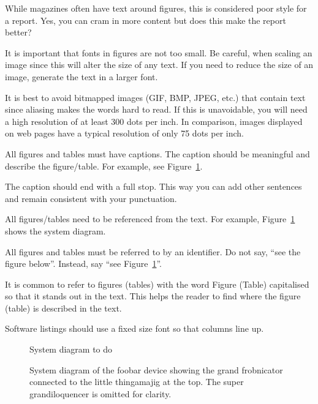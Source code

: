 \documentclass[a4paper,12pt]{article}
\newcommand{\reffig}[1]{\mbox{Figure~\ref{fig:#1}}}
\newcounter{foo}
\newcounter{bar}
\begin{document}
\begin{list}{F-}{}
\item While magazines often have text around figures, this is
  considered poor style for a report.  Yes, you can cram in more
  content but does this make the report better?

\item It is important that fonts in figures are not too small.  Be
  careful, when scaling an image since this will alter the size of any
  text.  If you need to reduce the size of an image, generate the text
  in a larger font.

\item It is best to avoid bitmapped images (GIF, BMP, JPEG, etc.) that
contain text since aliasing makes the words hard to read.  If this is
unavoidable, you will need a high resolution of at least 300 dots per
inch.  In comparison, images displayed on web pages have a typical
resolution of only 75 dots per inch.

\item All figures and tables must have captions.  The caption should
  be meaningful and describe the figure/table.  For example, see
  \reffig{example_figure1}.

\item The caption should end with a full stop.  This way you can add
  other sentences and remain consistent with your punctuation.

\item All figures/tables need to be referenced from the text.  For
  example, \reffig{example_figure1} shows the system diagram.

\item All figures and tables must be referred to by an identifier.
  Do not say, ``see the figure below''.  Instead, say ``see
  \reffig{example_figure1}''.

\item It is common to refer to figures (tables) with the word Figure
  (Table) capitalised so that it stands out in the text.  This helps
  the reader to find where the figure (table) is described in the
  text.

\item Software listings should use a fixed size font so that columns
line up.
\end{list}


\begin{figure}
\vspace{1cm}
  \begin{center}
    System diagram to do
\vspace{1cm}
  \end{center}
  \caption{System diagram of the foobar device showing the grand
    frobnicator connected to the little thingamajig at the top.  The
    super grandiloquencer is omitted for clarity.}
\label{fig:example_figure1}
\end{figure}
\end{document}
